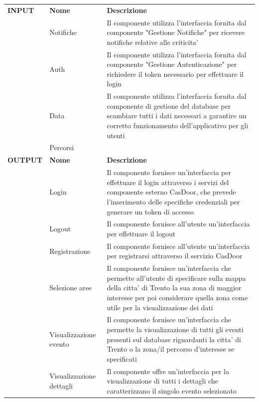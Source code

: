 \documentclass{article}
\begin{document}
\begin{table}[htbp]
    \centering
    \begin{tabularx}{\textwidth}{| l | l | X |}
        \Xhline{2pt}
        \textbf{INPUT} & \textbf{Nome} & \textbf{Descrizione} \\
        \Xhline{2pt}
         & Notifiche & Il componente utilizza l'interfaccia fornita dal componente "Gestione Notifiche" per ricevere notifiche relative alle criticita' \\
        \hline
         & Auth & Il componente utilizza l'interfaccia fornita dal componente "Gestione Autenticazione" per richiedere il token necessario per effettuare il login \\
        \hline
         & Data & Il componente utilizza l'interfaccia fornita dal componente di gestione del database per scambiare tutti i dati necessari a garantire un corretto funzionamento dell'applicativo per gli utenti \\
        \hline
         & Percorsi &  \\
        \Xhline{2pt}
        \textbf{OUTPUT} & \textbf{Nome} & \textbf{Descrizione} \\
        \Xhline{2pt}
         & Login & Il componente fornisce un'interfaccia per effettuare il login attraverso i servizi del componente esterno CasDoor, che prevede l'inserimento delle specifiche credenziali per generare un token di accesso \\
        \hline
         & Logout & Il componente fornisce all'utente un'interfaccia per effettuare il logout \\
        \hline
         & Registrazione & Il componente fornisce all'utente un'interfaccia per registrarsi attraverso il servizio CasDoor \\
        \hline
         & Selezione aree & Il componente fornisce un'interfaccia che permette all'utente di specificare sulla mappa della citta' di Trento la sua zona di maggior interesse per poi considerare quella zona come utile per la visualizzazione dei dati \\
        \hline
         & Visualizzazione evento & Il componente fornisce un'interfaccia che permette la visualizzazione di tutti gli eventi presenti sul database riguardanti la citta' di Trento o la zona/il percorso d'interesse se specificati \\
        \hline
         & Visualizzazione dettagli & Il componente offre un'interfaccia per la visualizzazione di tutti i dettagli che caratterizzano il singolo evento selezionato \\

\end{tabularx}
\end{table}
\end{document}
